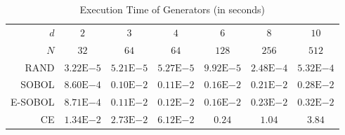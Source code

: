 \documentclass[graybox]{svmult}
\begin{document}
\begin{table}[htbp]
  \centering
  \caption{Execution Time of Generators (in seconds)}
    \begin{tabular}{r*6{@{\ \ }c}}
    \toprule
         $d$ & $2$   & $3$   & $4$   & $6$   & $8$   & $10$ \\
  $N$ & $32$   & $64$   & $64$   & $128$   & $256$   & $512$ \\
    \hline
    RAND  & $3.22\text{E}{-5}$      &  $5.21\text{E}{-5}$     & $5.27\text{E}{-5}$      &  $9.92\text{E}{-5}$     & $2.48\text{E}{-4}$      & $ 5.32\text{E}{-4}$ \\
    SOBOL & $8.60\text{E}{-4}$      &  $0.10\text{E}{-2}$     &    $0.11\text{E}{-2}$   &  $0.16\text{E}{-2}$     & $0.21\text{E}{-2}$      &  $0.28\text{E}{-2}$\\
    E-SOBOL & $8.71\text{E}{-4}$  & $0.11\text{E}{-2}$      &     $0.12\text{E}{-2}$  &  $0.16\text{E}{-2}$     &   $0.23\text{E}{-2}$    & $0.32\text{E}{-2}$  \\
    CE    & $1.34\text{E}{-2}$      & $2.73\text{E}{-2}$      & $6.12\text{E}{-2}$      &   $0.24$    &   $1.04$    & $3.84$  \\
    \hline
    \end{tabular}%
  \label{tab:ExeTime}%
\end{table}%

\begin{comment}
\begin{table}[htbp]
  \centering
  \caption{Execution Time of Generators (in seconds)}
    \begin{tabular}{ccccccc}
    \hline
          & $d=2,$   & $d=3,$   & $d=4,$   & $d=6,$   & $d=8,$   & $d=10,$ \\
  & $N=32$   & $N=64$   & $N=64$   & $N=128$   & $N=256$   & $N =512$ \\
    \hline
    RAND  & $3.22\times 10^{-5}$      &  $5.21\times 10^{-5}$     & $5.27\times 10^{-5}$      &  $9.92\times 10^{-5}$     & $2.48\times 10^{-4}$      & $ 5.32\times 10^{-4}$ \\
    SOBOL & $8.60\times 10^{-4}$      &  $0.10\times 10^{-2}$     &    $0.11\times 10^{-2}$   &  $0.16\times 10^{-2}$     & $0.21\times 10^{-2}$      &  $0.28\times 10^{-2}$\\
    E-SOBOL & $8.71\times 10^{-4}$  & $0.11\times 10^{-2}$      &     $0.12\times 10^{-2}$  &  $0.16\times 10^{-2}$     &   $0.23\times 10^{-2}$    & $0.32\times 10^{-2}$  \\
    CE    & $1.34\times 10^{-2}$      & $2.73\times 10^{-2}$      & $6.12\times 10^{-2}$      &   $0.24$    &   $1.04$    & $3.84$  \\
    \hline
    \end{tabular}%
  \label{tab:ExeTime}%
\end{table}%
\end{comment}
\end{document}
